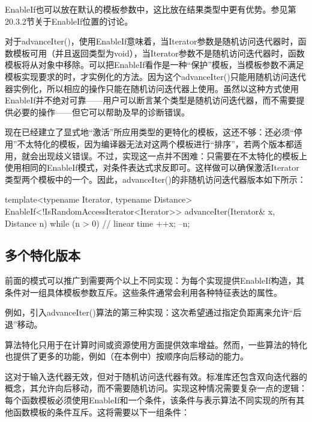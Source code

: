 \begin{notice}
EnableIf也可以放在默认的模板参数中，这比放在结果类型中更有优势。参见第20.3.2节关于EnableIf位置的讨论。
\end{notice}

对于advanceIter()，使用EnableIf意味着，当Iterator参数是随机访问迭代器时，函数模板可用（并且返回类型为void），当Iterator参数不是随机访问迭代器时，函数模板将从对象中移除。可以把EnableIf看作是一种“保护”模板，当模板参数不满足模板实现要求的时，才实例化的方法。因为这个advanceIter()只能用随机访问迭代器实例化，所以相应的操作只能在随机访问迭代器上使用。虽然以这种方式使用EnableIf并不绝对可靠——用户可以断言某个类型是随机访问迭代器，而不需要提供必要的操作——但它可以帮助及早的诊断错误。

现在已经建立了显式地“激活”所应用类型的更特化的模板，这还不够：还必须“停用”不太特化的模板，因为编译器无法对这两个模板进行“排序”，若两个版本都适用，就会出现歧义错误。不过，实现这一点并不困难：只需要在不太特化的模板上使用相同的EnableIf模式，对条件表达式求反即可。这样做可以确保激活Iterator类型两个模板中的一个。因此，advanceIter()的非随机访问迭代器版本如下所示：

\begin{cpp}
template<typename Iterator, typename Distance>
EnableIf<!IsRandomAccessIterator<Iterator>>
advanceIter(Iterator& x, Distance n)
{
	while (n > 0) { // linear time
		++x;
		--n;
	}
}
\end{cpp}

\subsection{多个特化版本}

前面的模式可以推广到需要两个以上不同实现：为每个实现提供EnableIf构造，其条件对一组具体模板参数互斥。这些条件通常会利用各种特征表达的属性。

例如，引入advanceIter()算法的第三种实现：这次希望通过指定负距离来允许“后退”移动。

\begin{notice}
算法特化只用于在计算时间或资源使用方面提供效率增益。然而，一些算法的特化也提供了更多的功能，例如（在本例中）按顺序向后移动的能力。
\end{notice}

这对于输入迭代器无效，但对于随机访问迭代器有效。标准库还包含双向迭代器的概念，其允许向后移动，而不需要随机访问。实现这种情况需要复杂一点的逻辑：每个函数模板必须使用EnableIf和一个条件，该条件与表示算法不同实现的所有其他函数模板的条件互斥。这将需要以下一组条件：

